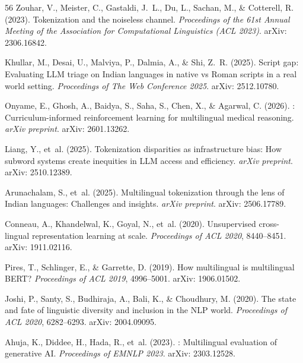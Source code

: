 \documentclass[11pt,a4paper]{article}
\begin{document}
\begin{thebibliography}{56}
Zouhar, V., Meister, C., Gastaldi, J.~L., Du, L., Sachan, M., \& Cotterell, R. (2023).
\newblock Tokenization and the noiseless channel.
\newblock \emph{Proceedings of the 61st Annual Meeting of the Association for Computational Linguistics (ACL 2023)}.
\newblock arXiv: 2306.16842.

Khullar, M., Desai, U., Malviya, P., Dalmia, A., \& Shi, Z.~R. (2025).
\newblock Script gap: Evaluating {LLM} triage on {Indian} languages in native vs {Roman} scripts in a real world setting.
\newblock \emph{Proceedings of The Web Conference 2025}.
\newblock arXiv: 2512.10780.

Onyame, E., Ghosh, A., Baidya, S., Saha, S., Chen, X., \& Agarwal, C. (2026).
: Curriculum-informed reinforcement learning for multilingual medical reasoning.
\newblock \emph{arXiv preprint}.
\newblock arXiv: 2601.13262.

Liang, Y., et~al. (2025).
\newblock Tokenization disparities as infrastructure bias: How subword systems create inequities in {LLM} access and efficiency.
\newblock \emph{arXiv preprint}.
\newblock arXiv: 2510.12389.

Arunachalam, S., et~al. (2025).
\newblock Multilingual tokenization through the lens of {Indian} languages: Challenges and insights.
\newblock \emph{arXiv preprint}.
\newblock arXiv: 2506.17789.

Conneau, A., Khandelwal, K., Goyal, N., et~al. (2020).
\newblock Unsupervised cross-lingual representation learning at scale.
\newblock \emph{Proceedings of ACL 2020}, 8440--8451.
\newblock arXiv: 1911.02116.

Pires, T., Schlinger, E., \& Garrette, D. (2019).
\newblock How multilingual is multilingual {BERT}?
\newblock \emph{Proceedings of ACL 2019}, 4996--5001.
\newblock arXiv: 1906.01502.

Joshi, P., Santy, S., Budhiraja, A., Bali, K., \& Choudhury, M. (2020).
\newblock The state and fate of linguistic diversity and inclusion in the {NLP} world.
\newblock \emph{Proceedings of ACL 2020}, 6282--6293.
\newblock arXiv: 2004.09095.

Ahuja, K., Diddee, H., Hada, R., et~al. (2023).
: Multilingual evaluation of generative {AI}.
\newblock \emph{Proceedings of EMNLP 2023}.
\newblock arXiv: 2303.12528.


\end{thebibliography}
\end{document}
